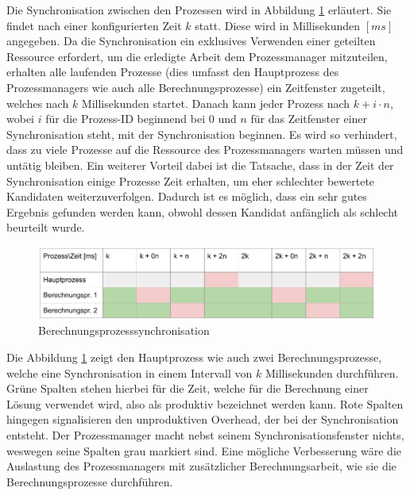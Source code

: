 Die Synchronisation zwischen den Prozessen wird in Abbildung \ref{fig:berechnungsprozess_synchronisation} erläutert.
Sie findet nach einer konfigurierten Zeit $k$ statt. Diese wird in Millisekunden $[ms]$
angegeben. Da die Synchronisation ein exklusives Verwenden einer geteilten Ressource erfordert, um die erledigte Arbeit
dem Prozessmanager mitzuteilen, erhalten alle laufenden Prozesse (dies umfasst den Hauptprozess des Prozessmanagers wie auch
alle Berechnungsprozesse) ein Zeitfenster zugeteilt, welches nach $k$ Millisekunden startet. Danach kann jeder Prozess nach
$k + i \cdot n$, wobei $i$ für die Prozess-ID beginnend bei $0$ und $n$ für das Zeitfenster einer Synchronisation steht,
mit der Synchronisation beginnen. Es wird so verhindert, dass zu viele Prozesse auf die Ressource des Prozessmanagers
warten müssen und untätig bleiben. Ein weiterer Vorteil dabei ist die Tatsache, dass in der Zeit der Synchronisation
einige Prozesse Zeit erhalten, um eher schlechter bewertete Kandidaten weiterzuverfolgen. Dadurch ist es möglich,
dass ein sehr gutes Ergebnis gefunden werden kann, obwohl dessen Kandidat anfänglich als schlecht beurteilt wurde.

\begin{figure}[h!]
    \begin{center}
        \includegraphics[width=0.8\linewidth]{../common/03_billiard_ai/resources/15_berechnungsprozess_synchronisation.png}
    \end{center}
    \caption{Berechnungsprozesssynchronisation}
    \label{fig:berechnungsprozess_synchronisation}
\end{figure}

Die Abbildung \ref{fig:berechnungsprozess_synchronisation} zeigt den Hauptprozess wie auch zwei Berechnungsprozesse, welche
eine Synchronisation in einem Intervall von $k$ Millisekunden durchführen. Grüne Spalten stehen hierbei für die Zeit, welche für die Berechnung
einer Lösung verwendet wird, also als produktiv bezeichnet werden kann. Rote Spalten hingegen signalisieren den unproduktiven
Overhead, der bei der Synchronisation entsteht. Der Prozessmanager macht nebst seinem Synchronisationsfenster nichts,
weswegen seine Spalten grau markiert sind. Eine mögliche Verbesserung wäre die Auslastung des Prozessmanagers mit zusätzlicher
Berechnungsarbeit, wie sie die Berechnungsprozesse durchführen.

